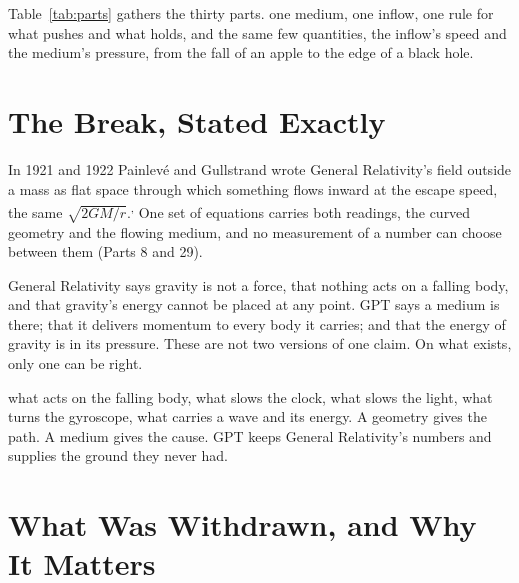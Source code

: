 Table~\ref{tab:parts} gathers the thirty parts.  one medium, one inflow, one rule for what pushes and what holds, and the same few quantities, the inflow's speed and the medium's pressure, from the fall of an apple to the edge of a black hole.

\section{The Break, Stated Exactly}

 In 1921 and 1922 Painlevé and Gullstrand wrote General Relativity's field outside a mass as flat space through which something flows inward at the escape speed, the same $\sqrt{2GM/r}$.\textsuperscript{,} One set of equations carries both readings, the curved geometry and the flowing medium, and no measurement of a number can choose between them (Parts 8 and 29).

 General Relativity says gravity is not a force, that nothing acts on a falling body, and that gravity's energy cannot be placed at any point. GPT says a medium is there; that it delivers momentum to every body it carries; and that the energy of gravity is in its pressure. These are not two versions of one claim. On what exists, only one can be right.

 what acts on the falling body, what slows the clock, what slows the light, what turns the gyroscope, what carries a wave and its energy. A geometry gives the path. A medium gives the cause. GPT keeps General Relativity's numbers and supplies the ground they never had.

\section{What Was Withdrawn, and Why It Matters}

